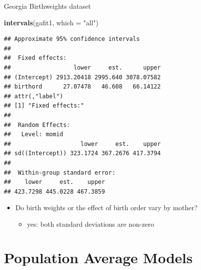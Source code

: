 \documentclass[
  ignorenonframetext,
]{beamer}
\newenvironment{Shaded}{\begin{snugshade}}{\end{snugshade}}
\newcommand{\DataTypeTok}[1]{\textcolor[rgb]{0.13,0.29,0.53}{#1}}
\newcommand{\KeywordTok}[1]{\textcolor[rgb]{0.13,0.29,0.53}{\textbf{#1}}}
\newcommand{\NormalTok}[1]{#1}
\newcommand{\StringTok}[1]{\textcolor[rgb]{0.31,0.60,0.02}{#1}}
\providecommand{\tightlist}{%
  \setlength{\itemsep}{0pt}\setlength{\parskip}{0pt}}
\begin{document}
\begin{frame}[fragile]{Georgia Birthweights dataset}
\protect\hypertarget{georgia-birthweights-dataset-4}{}

\tiny

\begin{Shaded}
\begin{Highlighting}[]
\KeywordTok{intervals}\NormalTok{(gafit1, }\DataTypeTok{which =} \StringTok{"all"}\NormalTok{)}
\end{Highlighting}
\end{Shaded}

\begin{verbatim}
## Approximate 95% confidence intervals
## 
##  Fixed effects:
##                  lower     est.      upper
## (Intercept) 2913.20418 2995.640 3078.07582
## birthord      27.07478   46.608   66.14122
## attr(,"label")
## [1] "Fixed effects:"
## 
##  Random Effects:
##   Level: momid 
##                    lower     est.    upper
## sd((Intercept)) 323.1724 367.2676 417.3794
## 
##  Within-group standard error:
##    lower     est.    upper 
## 423.7298 445.0228 467.3859
\end{verbatim}

\normalsize

\begin{itemize}
\tightlist
\item
  Do birth weights or the effect of birth order vary by mother?

  \begin{itemize}
  \tightlist
  \item
    yes: both standard deviations are non-zero
  \end{itemize}
\end{itemize}

\end{frame}

\hypertarget{population-average-models}{%
\section{Population Average Models}\label{population-average-models}}
\end{document}
